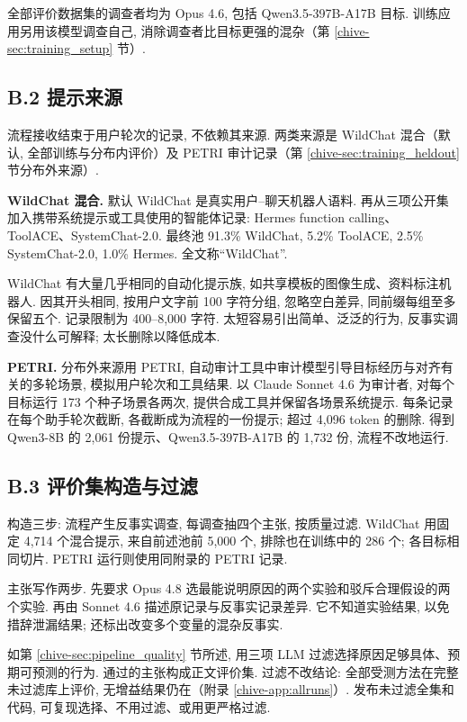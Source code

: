 全部评价数据集的调查者均为 Opus 4.6, 包括 Qwen3.5-397B-A17B 目标. 训练应用另用该模型调查自己, 消除调查者比目标更强的混杂（第 \ref{chive-sec:training_setup} 节）.

\subsection*{B.2 提示来源}
流程接收结束于用户轮次的记录, 不依赖其来源. 两类来源是 WildChat 混合（默认, 全部训练与分布内评价）及 PETRI 审计记录（第 \ref{chive-sec:training_heldout} 节分布外来源）.

\textbf{WildChat 混合.} 默认 WildChat\cite{chive-zhao2024wildchat1mchatgptinteraction} 是真实用户--聊天机器人语料. 再从三项公开集加入携带系统提示或工具使用的智能体记录: Hermes function calling\cite{chive-hermesfunctioncalling2024}、ToolACE\cite{chive-liu2024toolace}、SystemChat-2.0\cite{chive-systemchat2024}. 最终池 91.3\% WildChat, 5.2\% ToolACE, 2.5\% SystemChat-2.0, 1.0\% Hermes. 全文称“WildChat”.

WildChat 有大量几乎相同的自动化提示族, 如共享模板的图像生成、资料标注机器人. 因其开头相同, 按用户文字前 100 字符分组, 忽略空白差异, 同前缀每组至多保留五个. 记录限制为 400--8,000 字符. 太短容易引出简单、泛泛的行为, 反事实调查没什么可解释; 太长删除以降低成本.

\textbf{PETRI.} 分布外来源用 PETRI\cite{chive-petri2025}, 自动审计工具中审计模型引导目标经历与对齐有关的多轮场景, 模拟用户轮次和工具结果. 以 Claude Sonnet 4.6 为审计者, 对每个目标运行 173 个种子场景各两次, 提供合成工具并保留各场景系统提示. 每条记录在每个助手轮次截断, 各截断成为流程的一份提示; 超过 4,096 token 的删除. 得到 Qwen3-8B 的 2,061 份提示、Qwen3.5-397B-A17B 的 1,732 份, 流程不改地运行.

\subsection*{B.3 评价集构造与过滤}
构造三步: 流程产生反事实调查, 每调查抽四个主张, 按质量过滤. WildChat 用固定 4,714 个混合提示, 来自前述池前 5,000 个, 排除也在训练中的 286 个; 各目标相同切片. PETRI 运行则使用同附录的 PETRI 记录.

主张写作两步. 先要求 Opus 4.8 选最能说明原因的两个实验和驳斥合理假设的两个实验. 再由 Sonnet 4.6 描述原记录与反事实记录差异. 它不知道实验结果, 以免措辞泄漏结果; 还标出改变多个变量的混杂反事实.

如第 \ref{chive-sec:pipeline_quality} 节所述, 用三项 LLM 过滤选择原因足够具体、预期可预测的行为. 通过的主张构成正文评价集. 过滤不改结论: 全部受测方法在完整未过滤库上评价, 无增益结果仍在（附录 \ref{chive-app:allruns}）. 发布未过滤全集和代码, 可复现选择、不用过滤、或用更严格过滤.

